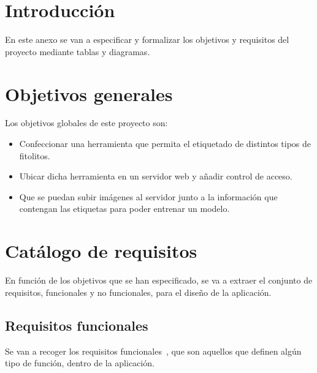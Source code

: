 
\section{Introducción}
En este anexo se van a especificar y formalizar los objetivos y requisitos del proyecto mediante tablas y diagramas.

\section{Objetivos generales}
Los objetivos globales de este proyecto son:
\begin{itemize}
	\item Confeccionar una herramienta que permita el etiquetado de distintos tipos de fitolitos.
	
	\item Ubicar dicha herramienta en un servidor web y añadir control de acceso.
	
	\item Que se puedan subir imágenes al servidor junto a la información que contengan las etiquetas para poder entrenar un modelo.

\end{itemize}
\section{Catálogo de requisitos}
En función de los objetivos que se han especificado, se va a extraer el conjunto de requisitos, funcionales y no funcionales, para el diseño de la aplicación.

\subsection{Requisitos funcionales}
Se van a recoger los requisitos funcionales~\cite{fun}, que son aquellos que definen algún tipo de función, dentro de la aplicación.

